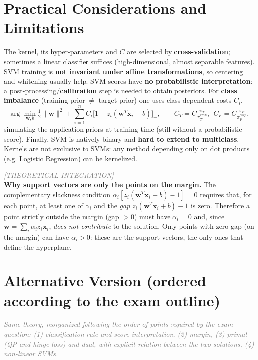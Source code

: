 \section*{Practical Considerations and Limitations}

The kernel, its hyper-parameters and $C$ are selected by \textbf{cross-validation}; sometimes a linear classifier suffices (high-dimensional, almost separable features). SVM training is \textbf{not invariant under affine transformations}, so centering and whitening usually help. SVM scores have \textbf{no probabilistic interpretation}: a post-processing/\textbf{calibration} step is needed to obtain posteriors. For \textbf{class imbalance} (training prior $\ne$ target prior) one uses class-dependent costs $C_i$,
\[
\arg\min_{\mathbf{w},b}\tfrac12\|\mathbf{w}\|^2+\sum_{i=1}^n C_i\big[1-z_i(\mathbf{w}^T\mathbf{x}_i+b)\big]_+,\qquad
C_T=C\tfrac{\pi_T}{\pi_T^{emp}},\ \ C_F=C\tfrac{\pi_F}{\pi_F^{emp}},
\]
simulating the application priors at training time (still without a probabilistic score). Finally, SVM is natively binary and \textbf{hard to extend to multiclass}. Kernels are not exclusive to SVMs: any method depending only on dot products (e.g. Logistic Regression) can be kernelized.

\begin{tcolorbox}[colframe=blue!70!black, colback=white, sharp corners=southwest, left=2mm, boxrule=1pt, enhanced, breakable]
\textcolor{gray}{\footnotesize\textit{[THEORETICAL INTEGRATION]}}\\
\textbf{Why support vectors are only the points on the margin.} The complementary slackness condition $\alpha_i[z_i(\mathbf{w}^T\mathbf{x}_i+b)-1]=0$ requires that, for each point, at least one of $\alpha_i$ and the \emph{gap} $z_i(\mathbf{w}^T\mathbf{x}_i+b)-1$ is zero. Therefore a point strictly outside the margin (gap $>0$) must have $\alpha_i=0$ and, since $\mathbf{w}=\sum_i\alpha_iz_i\mathbf{x}_i$, \emph{does not contribute} to the solution. Only points with zero gap (on the margin) can have $\alpha_i>0$: these are the support vectors, the only ones that define the hyperplane.
\end{tcolorbox}

\newpage
\section*{Alternative Version (ordered according to the exam outline)}

\textcolor{gray}{\footnotesize\textit{Same theory, reorganized following the order of points required by the exam question: (1) classification rule and score interpretation, (2) margin, (3) primal (QP and hinge loss) and dual, with explicit relation between the two solutions, (4) non-linear SVMs.}}

